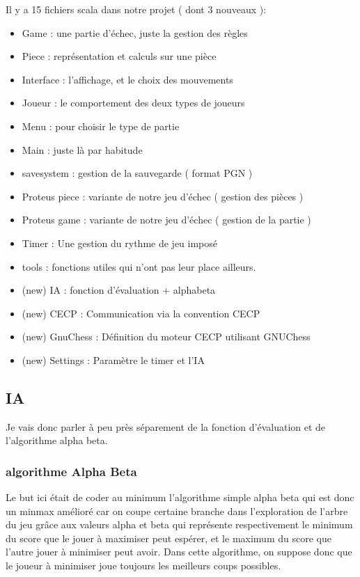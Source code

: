 \documentclass{article}
\begin{document}
Il y a 15 fichiers scala dans notre projet ( dont 3 nouveaux ):
\begin{itemize}
    \item Game : une partie d'échec, juste la gestion des règles
    \item Piece : représentation et calculs sur une pièce
    \item Interface : l'affichage, et le choix des mouvements
    \item Joueur : le comportement des deux types de joueurs
    \item Menu : pour choisir le type de partie
    \item Main : juste là par habitude
    \item savesystem : gestion de la sauvegarde ( format PGN )
    \item Proteus piece : variante de notre jeu d'échec ( gestion des pièces )
    \item Proteus game : variante de notre jeu d'échec ( gestion de la partie )
    \item Timer : Une gestion du rythme de jeu imposé
    \item tools : fonctions utiles qui n'ont pas leur place ailleurs.
    \item (new) IA : fonction d'évaluation + alphabeta
    \item (new) CECP :  Communication via la convention CECP
    \item (new) GnuChess : Définition du moteur CECP utilisant GNUChess
    \item (new) Settings : Paramètre le timer et l'IA
    
\end{itemize}

\subsection{IA}
Je vais donc parler à peu près séparement de la fonction d'évaluation et de l'algorithme alpha beta.

\subsubsection{algorithme Alpha Beta}
Le but ici était de coder au minimum l'algorithme simple alpha beta qui est donc un minmax amélioré car on coupe certaine branche dans l'exploration de l'arbre du jeu grâce aux valeurs alpha et beta qui représente respectivement le minimum du score que le jouer à maximiser peut espérer, et le maximum du score que l'autre jouer à minimiser peut avoir.
Dans cette algorithme, on suppose donc que le joueur à minimiser joue toujours les meilleurs coups possibles. \\
\end{document}
